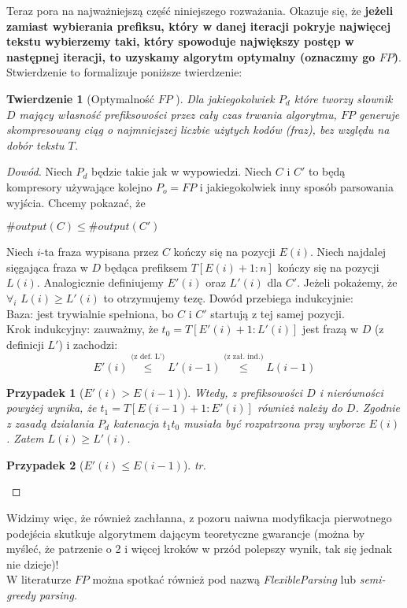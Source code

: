 \documentclass[12pt]{article}
\theoremstyle{plain}
\newtheorem{theorem}{Twierdzenie}[]
\newtheorem{case}{Przypadek}
\begin{document}
Teraz pora na najważniejszą część niniejszego rozważania. Okazuje się, że \textbf{jeżeli zamiast wybierania prefiksu, który w danej iteracji pokryje najwięcej tekstu wybierzemy taki, który spowoduje największy postęp w następnej iteracji, to uzyskamy algorytm optymalny (oznaczmy go $FP$)}. Stwierdzenie to formalizuje poniższe twierdzenie:

\begin{theorem}[Optymalność $FP$ \cite{DBLP:conf/soda/MatiasS99}]
Dla jakiegokolwiek $P_{d}$ które tworzy słownik $D$ mający własność prefiksowości przez cały czas trwania algorytmu, $FP$ generuje skompresowany ciąg o najmniejszej liczbie użytych kodów (fraz), bez względu na dobór tekstu $T$.
\end{theorem}
\begin{proof}[Dowód]
Niech $P_{d}$ będzie takie jak w wypowiedzi. Niech $C$ i $C'$ to będą kompresory używające kolejno $P_{o} = FP$ i jakiegokolwiek inny sposób parsowania wyjścia. Chcemy pokazać, że \begin{center}
$\#output(C) \leq \#output(C')$
\end{center}

Niech $i$-ta fraza wypisana przez $C$ kończy się na pozycji $E(i)$. 
Niech najdalej sięgająca fraza w $D$ będąca prefiksem $T[E(i)+1:n]$ kończy się na pozycji $L(i)$.
Analogicznie definiujemy $E'(i)$ oraz $L'(i)$ dla $C'$.
Jeżeli pokażemy, że $\forall_{i}$ $L(i) \geq L'(i)$ to otrzymujemy tezę. Dowód przebiega indukcyjnie:\\
Baza: jest trywialnie spełniona, bo $C$ i $C'$ startują z tej samej pozycji.\\
Krok indukcyjny: zauważmy, że $t_{0} = T[E'(i)+1:L'(i)]$ jest frazą w $D$ (z definicji $L'$) i zachodzi: 
\[E'(i) \overset{\text{(z def. L')}}{\leq} L'(i-1) \overset{\text{(z zał. ind.)}}{\leq} L(i-1) \]
\begin{case}[$E'(i) > E(i-1)$]
Wtedy, z prefiksowości $D$ i nierówności powyżej wynika, że $t_{1} = T[E(i-1)+1:E'(i)]$ również należy do $D$. Zgodnie z zasadą działania $P_{d}$ katenacja $t_{1}t_{0}$ musiała być rozpatrzona przy wyborze $E(i)$. Zatem $L(i) \geq L'(i)$.
\end{case}
\begin{case}[$E'(i) \leq E(i-1)$]
tr.
\end{case}
\end{proof}
Widzimy więc, że również zachłanna, z pozoru naiwna modyfikacja pierwotnego podejścia skutkuje algorytmem dającym teoretyczne gwarancje (można by myśleć, że patrzenie o 2 i więcej kroków w przód polepszy wynik, tak się jednak nie dzieje)! \\ W literaturze $FP$ można spotkać również pod nazwą \textit{FlexibleParsing} lub \textit{semi-greedy parsing}.
\end{document}
